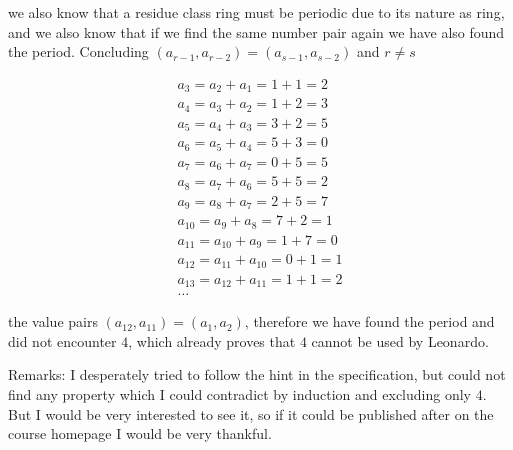 \documentclass[12pt,a4paper,titlepage,oneside]{article}
\begin{document}
we also know that a residue class ring must be periodic due to its nature as ring, and we also know that if we find the same number pair again we have also found the period. Concluding $(a_{r-1}, a_{r-2}) = (a_{s-1}, a_{s-2})$ and $r \neq s$

\begin{equation}
\begin{aligned}
a_3=a_2+a_1=1+1=2\\
a_4=a_3+a_2=1+2=3\\
a_5=a_4+a_3=3+2=5\\
a_6=a_5+a_4=5+3=0\\
a_7=a_6+a_7=0+5=5\\
a_8=a_7+a_6=5+5=2\\
a_9=a_8+a_7=2+5=7\\
a_10=a_9+a_8=7+2=1\\
a_11=a_10+a_9=1+7=0\\
a_12=a_11+a_10=0+1=1\\
a_13=a_12+a_11=1+1=2\\
\dots
\end{aligned}
\end{equation}

the value pairs $(a_{12}, a_{11}) = (a_1, a_2)$, therefore we have found the period and did not encounter $4$, which already proves that $4$ cannot be used by Leonardo.

{Remarks:}
I desperately tried to follow the hint in the specification, but could not find any property which I could contradict by induction and excluding only $4$. But I would be very interested to see it, so if it could be published after on the course homepage I would be very thankful.

\newpage
\appendix
\end{document}
